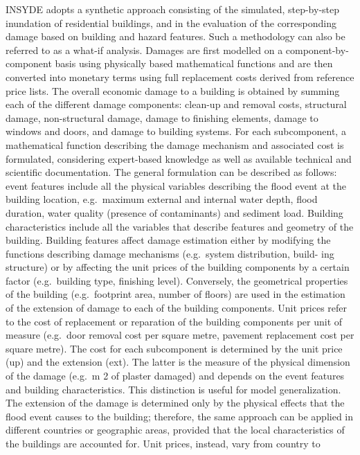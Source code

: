 \documentclass[gc, manuscript]{copernicus}
\begin{document}
INSYDE adopts a synthetic approach consisting of the simulated,
step-by-step inundation of residential buildings, and in the evaluation
of the corresponding damage based on building and hazard features. Such
a methodology can also be referred to as a what-if analysis. Damages are
first modelled on a component-by-component basis using physically based
mathematical functions and are then converted into monetary terms using
full replacement costs derived from reference price lists. The overall
economic damage to a building is obtained by summing each of the
different damage components: clean-up and removal costs, structural
damage, non-structural damage, damage to finishing elements, damage to
windows and doors, and damage to building systems. For each
subcomponent, a mathematical function describing the damage mechanism
and associated cost is formulated, considering expert-based knowledge as
well as available technical and scientific documentation. The general
formulation can be described as follows: event features include all the
physical variables describing the flood event at the building location,
e.g.~maximum external and internal water depth, flood duration, water
quality (presence of contaminants) and sediment load. Building
characteristics include all the variables that describe features and
geometry of the building. Building features affect damage estimation
either by modifying the functions describing damage mechanisms
(e.g.~system distribution, build- ing structure) or by affecting the
unit prices of the building components by a certain factor
(e.g.~building type, finishing level). Conversely, the geometrical
properties of the building (e.g.~footprint area, number of floors) are
used in the estimation of the extension of damage to each of the
building components. Unit prices refer to the cost of replacement or
reparation of the building components per unit of measure (e.g.~door
removal cost per square metre, pavement replacement cost per square
metre). The cost for each subcomponent is determined by the unit price
(up) and the extension (ext). The latter is the measure of the physical
dimension of the damage (e.g.~m 2 of plaster damaged) and depends on the
event features and building characteristics. This distinction is useful
for model generalization. The extension of the damage is determined only
by the physical effects that the flood event causes to the building;
therefore, the same approach can be applied in different countries or
geographic areas, provided that the local characteristics of the
buildings are accounted for. Unit prices, instead, vary from country to
\end{document}

